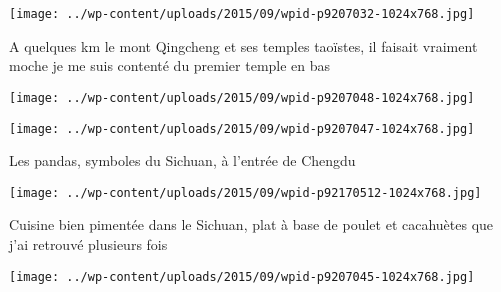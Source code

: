  \newline
 \newline
\centerline{\texttt{[image: ../wp-content/uploads/2015/09/wpid-p9207032-1024x768.jpg]} } 
 \newline
 A quelques km le mont Qingcheng et ses temples taoïstes, il faisait vraiment moche je me suis contenté du premier temple en bas \newline
 \newline
\centerline{\texttt{[image: ../wp-content/uploads/2015/09/wpid-p9207048-1024x768.jpg]} } 
 \newline
 \newline
\centerline{\texttt{[image: ../wp-content/uploads/2015/09/wpid-p9207047-1024x768.jpg]} } 
 \newline
 Les pandas, symboles du Sichuan, à l'entrée de Chengdu \newline
 \newline
\centerline{\texttt{[image: ../wp-content/uploads/2015/09/wpid-p92170512-1024x768.jpg]} } 
 \newline
 Cuisine bien pimentée dans le Sichuan, plat à base de poulet et cacahuètes que j'ai retrouvé plusieurs fois \newline
 \newline
\centerline{\texttt{[image: ../wp-content/uploads/2015/09/wpid-p9207045-1024x768.jpg]} } 
 \newline

\newpage
 

